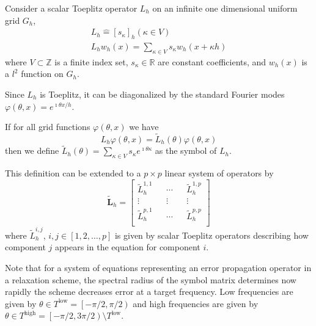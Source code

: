 Consider a scalar Toeplitz operator $L_h$ on an infinite one dimensional uniform grid $G_h$,
\begin{equation}
\begin{split}
L_h \mathrel{\hat{=}} \left[ s_\kappa \right]_h \left( \kappa \in V \right)\\
L_h w_h \left( x \right) = \sum_{\kappa \in V} s_\kappa w_h \left( x + \kappa h \right)
\end{split}
\end{equation}
where $V \subset \mathbb{Z}$ is a finite index set, $s_\kappa \in \mathbb{R}$ are constant coefficients, and $w_h \left( x \right)$ is a $l^2$ function on $G_h$.

Since $L_h$ is Toeplitz, it can be diagonalized by the standard Fourier modes $\varphi \left( \theta, x \right) = e^{\imath \theta x / h}$.

\begin{definition}[Symbol of $L_h$]\label{def:symbol}
If for all grid functions $\varphi \left( \theta, x \right)$ we have
\begin{equation}
L_h \varphi \left( \theta, x \right) = \tilde{L}_h \left( \theta \right) \varphi \left( \theta, x \right)
\end{equation}
then we define $\tilde{L}_h \left( \theta \right) = \sum_{\kappa \in V} s_\kappa e^{\imath \theta \kappa}$ as the symbol of $L_h$.
\end{definition}

This definition can be extended to a $p \times p$ linear system of operators by
\begin{equation}
\tilde{\mathbf{L}}_h =
\begin{bmatrix}
    \tilde{L}_h^{1, 1} && \cdots && \tilde{L}_h^{1, p} \\
    \vdots             && \vdots && \vdots             \\
    \tilde{L}_h^{p, 1} && \cdots && \tilde{L}_h^{p, p} \\
\end{bmatrix}
\end{equation}
where $\tilde{L}_h^{i, j}$, $i, j \in \left[1, 2, \dots, p \right]$ is given by scalar Toeplitz operators describing how component $j$ appears in the equation for component $i$.

Note that for a system of equations representing an error propagation operator in a relaxation scheme, the spectral radius of the symbol matrix determines now rapidly the scheme decreases error at a target frequency.
Low frequencies are given by $\theta \in T^{\text{low}} = \left[ - \pi / 2, \pi / 2 \right)$ and high frequencies are given by $\theta \in T^{\text{high}} = \left[ - \pi / 2, 3 \pi / 2 \right) \setminus T^{\text{low}}$.

